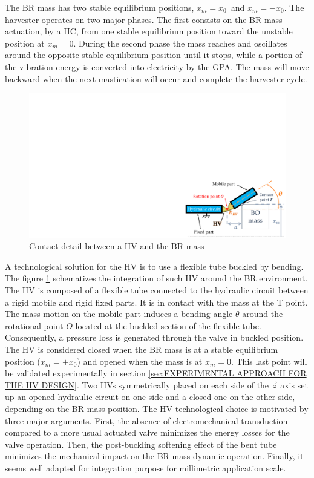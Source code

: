\documentclass[3p,twocolumn,preprint]{elsarticle}
\begin{document}
The BR mass has two stable equilibrium positions, \mbox{$x_m = x_0$ }and \mbox{$x_m = -x_0$}. The harvester operates on two major phases. The first consists on the BR mass actuation, by a HC, from one stable equilibrium position toward the unstable position at $x_m = 0$. During the second phase the mass reaches and oscillates around the opposite stable equilibrium position until it stops, while a portion of the vibration energy is converted into electricity by the GPA. The mass will move backward when the next mastication will occur and complete the harvester cycle.
\begin{figure}[!htbp]
	\centering
	\captionsetup{justification=centering}
	\includegraphics[trim={20.5cm 0cm 0cm 11.5cm},clip, width=0.8\linewidth]{figures/HV_actuation_detail.pdf}
	\caption{Contact detail between a HV and the BR mass} 
	\label{fig:HV_actuation_detail}
\end{figure}

A technological solution for the HV is to use a flexible tube buckled by bending. The figure \ref{fig:HV_actuation_detail} schematizes the integration of such HV around the BR environment. The HV is composed of a flexible tube connected to the hydraulic circuit between a rigid mobile and rigid fixed parts. It is in contact with the mass at the T point. The mass motion on the mobile part induces a bending angle $\theta$ around the rotational point $O$ located at the buckled section of the flexible tube. Consequently, a pressure loss is generated through the valve in buckled position. The HV is considered closed when the BR mass is at a stable equilibrium position ($x_m=\pm x_0$) and opened when the mass is at $x_m=0$. This last point will be validated experimentally in section \ref{sec:EXPERIMENTAL APPROACH FOR THE HV DESIGN}. Two HVs symmetrically placed on each side of the $\vec{z}$ axis set up an opened hydraulic circuit on one side and a closed one on the other side, depending on the BR mass position. The HV technological choice is motivated by three major arguments. First, the absence of electromechanical transduction compared to a more usual actuated valve minimizes the energy losses for the valve operation. Then, the post-buckling softening effect of the bent tube minimizes the mechanical impact on the BR mass dynamic operation. Finally, it seems well adapted for integration purpose for millimetric application scale.
\end{document}
